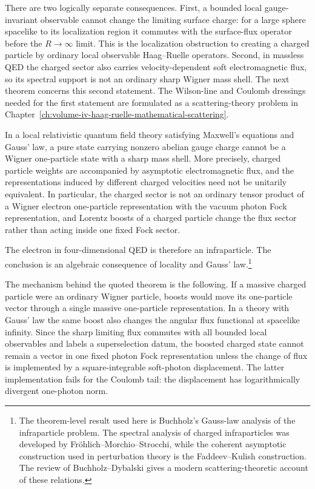 There are two logically separate consequences.  First, a bounded local
gauge-invariant observable cannot change the limiting surface charge: for a
large sphere spacelike to its localization region it commutes with the
surface-flux operator before the \(R\to\infty\) limit.  This is the
localization obstruction to creating a charged particle by ordinary local
observable Haag--Ruelle operators.  Second, in massless QED the charged sector
also carries velocity-dependent soft electromagnetic flux, so its spectral
support is not an ordinary sharp Wigner mass shell.  The next theorem concerns
this second statement.  The Wilson-line and Coulomb dressings needed for the
first statement are formulated as a scattering-theory problem in
Chapter~\ref{ch:volume-iv-haag-ruelle-mathematical-scattering}.

\begin{quotedtheorem}
\label{qthm:buchholz-infraparticle-obstruction}
In a local relativistic quantum field theory satisfying Maxwell's equations
and Gauss' law, a pure state carrying nonzero abelian gauge charge cannot be a
Wigner one-particle state with a sharp mass shell.  More precisely, charged
particle weights are accompanied by asymptotic electromagnetic flux, and the
representations induced by different charged velocities need not be unitarily
equivalent.  In particular, the charged sector is not an ordinary tensor
product of a Wigner electron one-particle representation with the vacuum
photon Fock representation, and Lorentz boosts of a charged particle change
the flux sector rather than acting inside one fixed Fock sector.
\end{quotedtheorem}

The electron in four-dimensional QED is therefore an infraparticle.  The
conclusion is an algebraic consequence of locality and Gauss'
law.\footnote{The theorem-level result used here is Buchholz's Gauss-law
analysis of the infraparticle problem.  The spectral analysis of charged
infraparticles was developed by Fr\"ohlich--Morchio--Strocchi, while the
coherent asymptotic construction used in perturbation theory is the
Faddeev--Kulish construction.  The review of Buchholz--Dybalski gives a
modern scattering-theoretic account of these relations.}

The mechanism behind the quoted theorem is the following.  If a massive
charged particle were an ordinary Wigner particle, boosts would move its
one-particle vector through a single massive one-particle representation.  In
a theory with Gauss' law the same boost also changes the angular flux
functional at spacelike infinity.  Since the sharp limiting flux commutes
with all bounded local observables and labels a superselection datum, the
boosted charged state cannot remain a vector in one fixed photon Fock
representation unless the change of flux is implemented by a square-integrable
soft-photon displacement.  The latter implementation fails for the Coulomb
tail: the displacement has logarithmically divergent one-photon norm.

